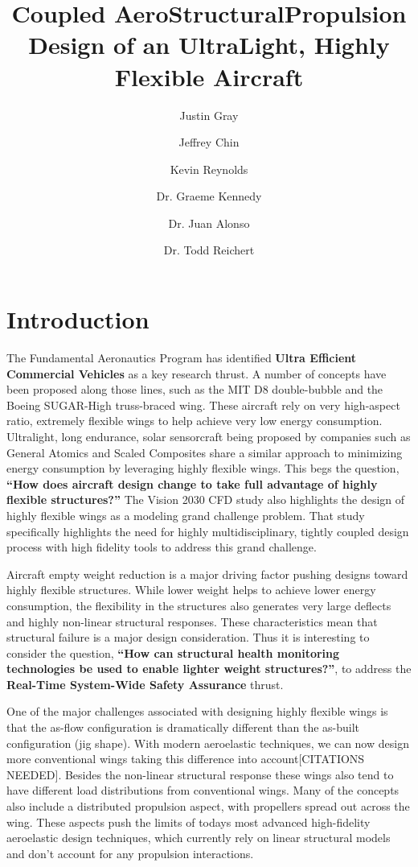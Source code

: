 \documentclass[]{aiaa-tc}
\title{Coupled Aero­Structural­Propulsion Design of an Ultra­Light, Highly Flexible Aircraft}
\author[1]{Justin Gray}
\author[1]{Jeffrey Chin}
\author[2]{Kevin Reynolds}
\author[3]{Dr. Graeme Kennedy}
\author[4]{Dr. Juan Alonso}
\author[4]{Dr. Todd Reichert}
\affil[1]{Aerospace Engineer, NASA Glenn Research Center - LTA Branch}
\affil[2]{Aerospace Engineer, NASA Ames Research Center - ??? Branch}
\affil[3]{Assistant Professor, Georgia Institute of Technology, School of Aerospace Engineering}
\affil[4]{Associate Professor, Stanford University, Department of Aeronautics and Astronautics}
\affil[5]{Vice President of Aerodynamics, AeroVelo Inc.}
\begin{document}
  \maketitle

  \section{Introduction}

    The Fundamental Aeronautics Program has identified \textbf{Ultra Efficient Commercial Vehicles} as 
    a key research thrust. A number of concepts have been proposed along those lines, such as 
    the MIT D8 double­-bubble and the Boeing SUGAR­-High truss­-braced wing. These aircraft rely on 
    very high­-aspect ratio, extremely flexible wings to help achieve very low energy consumption. Ultralight, 
    long endurance, solar sensorcraft being proposed by companies such as General Atomics and 
    Scaled Composites share a similar approach to minimizing energy consumption by leveraging highly 
    flexible wings. This begs the question, \textbf{``How does aircraft design change to take full 
    advantage of highly flexible structures?''} The Vision 2030 CFD study also highlights the 
    design of highly flexible wings as a modeling grand challenge problem. That study specifically 
    highlights the need for highly multidisciplinary, tightly coupled design process with high 
    fidelity tools to address this grand challenge.

    Aircraft empty weight reduction is a major driving factor pushing designs toward highly flexible structures. 
    While lower weight helps to achieve lower energy consumption, the flexibility in the structures also 
    generates very large deflects and highly non-linear structural responses. These characteristics mean that 
    structural failure is a major design consideration. Thus it is interesting to consider the question, 
    \textbf{``How can structural health monitoring technologies be used to enable lighter 
    weight structures?''}, to address the \textbf{Real­-Time System­-Wide Safety Assurance} thrust. 

    One of the major challenges associated with designing highly flexible wings is that the as-flow configuration 
    is dramatically different than the as-built configuration (jig shape). With modern aeroelastic techniques, 
    we can now design more conventional wings taking this difference into account[CITATIONS NEEDED]. Besides the non-linear structural 
    response these wings also tend to have different load distributions from conventional wings. Many of the concepts 
    also include a distributed propulsion aspect, with propellers spread out across the wing. These aspects push the 
    limits of todays most advanced high-fidelity aeroelastic design techniques, which currently rely on linear structural 
    models and don't account for any propulsion interactions. 
\end{document}
